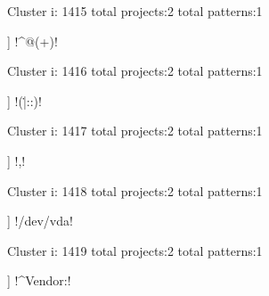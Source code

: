 Cluster i: 1415
total projects:2
total patterns:1
\begin{multicols}{1}
\begin{description}[noitemsep,topsep=0pt]
\item [[2] ] \cverb!^@(\w+)!
\end{description}
\end{multicols}







Cluster i: 1416
total projects:2
total patterns:1
\begin{multicols}{1}
\begin{description}[noitemsep,topsep=0pt]
\item [[2] ] \cverb!(\.|::)!
\end{description}
\end{multicols}







Cluster i: 1417
total projects:2
total patterns:1
\begin{multicols}{1}
\begin{description}[noitemsep,topsep=0pt]
\item [[2] ] \cverb!\s*,\s!
\end{description}
\end{multicols}







Cluster i: 1418
total projects:2
total patterns:1
\begin{multicols}{1}
\begin{description}[noitemsep,topsep=0pt]
\item [[2] ] \cverb!/dev/vda!
\end{description}
\end{multicols}







Cluster i: 1419
total projects:2
total patterns:1
\begin{multicols}{1}
\begin{description}[noitemsep,topsep=0pt]
\item [[2] ] \cverb!^Vendor:!
\end{description}
\end{multicols}







